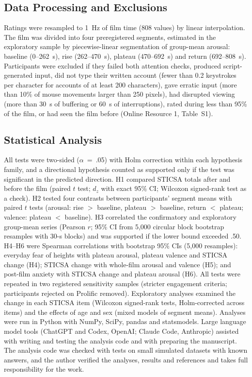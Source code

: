 \documentclass[man,12pt,british]{apa7}
\begin{document}
\subsection{Data Processing and Exclusions}

Ratings were resampled to 1~Hz of film time (808 values) by linear interpolation. The film was divided into four
preregistered segments, estimated in the exploratory sample by piecewise-linear segmentation of group-mean arousal:
baseline (0--262~s), rise (262--470~s), plateau (470--692~s) and return (692--808~s). Participants were excluded if
they failed both attention checks, produced script-generated input, did not type their written account (fewer than
0.2 keystrokes per character for accounts of at least 200 characters), gave erratic input (more than 10\% of mouse
movements larger than 250 pixels), had disrupted viewing (more than 30~s of buffering or 60~s of interruptions),
rated during less than 95\% of the film, or had seen the film before (Online Resource 1, Table~S1).

\subsection{Statistical Analysis}

All tests were two-sided ($\alpha$~=~.05) with Holm correction within each hypothesis family, and a directional
hypothesis counted as supported only if the test was significant in the predicted direction. H1 compared STICSA
totals after and before the film (paired $t$ test; $d_z$ with exact 95\% CI; Wilcoxon signed-rank test as a check).
H2 tested four contrasts between participants' segment means with paired $t$ tests (arousal: rise $>$ baseline,
plateau $>$ baseline, return $<$ plateau; valence: plateau $<$ baseline). H3 correlated the confirmatory and
exploratory group-mean series (Pearson $r$; 95\% CI from 5,000 circular block bootstrap resamples with 30-s blocks)
and was supported if the lower bound exceeded .50. H4--H6 were Spearman correlations with bootstrap 95\% CIs (5,000
resamples): everyday fear of heights with plateau arousal, plateau valence and STICSA change (H4); STICSA change with
whole-film arousal and valence (H5); and post-film anxiety with STICSA change and plateau arousal (H6). All tests were
repeated in two registered sensitivity samples (stricter engagement criteria; participants rejected on Prolific
removed). Exploratory analyses examined the change in each STICSA item (Wilcoxon signed-rank tests, Holm-corrected
across items) and the effects of age and sex (mixed models of segment means). Analyses were run in Python
 with NumPy, SciPy, pandas and statsmodels. Large language model tools (ChatGPT and Codex, OpenAI;
Claude Code, Anthropic) assisted with writing and testing the analysis code and with preparing the manuscript. The
analysis code was checked with tests on small simulated datasets with known answers, and the author verified the
analyses, results and references and takes full responsibility for the work.
\end{document}
